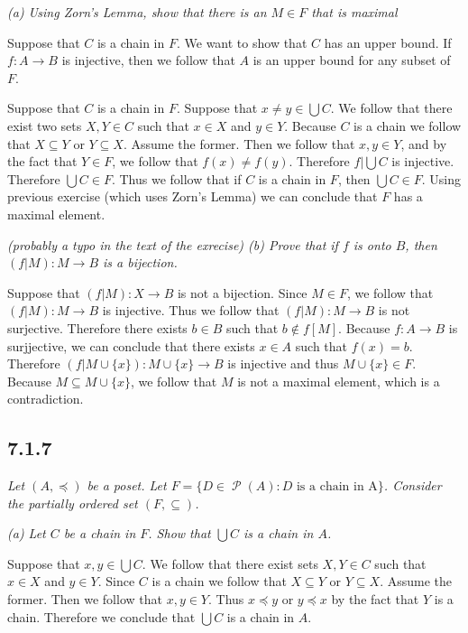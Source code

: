 \documentclass[11pt,oneside,titlepage]{book}
\DeclareMathOperator \pow {\mathcal {P}}
\newcommand{\set}[1]{\{ #1 \}}
\begin{document}
\textit{(a) Using Zorn's Lemma, show that there is an $M \in F$ that is maximal}

Suppose that $C$ is a chain in $F$. We want to show that $C$ has an upper bound.
If $f: A \to B$ is injective, then we follow that $A$ is an upper bound for any subset of $F$.

Suppose that $C$ is a chain in $F$. Suppose that $x \neq y \in \bigcup{C}$. We follow that
there exist two sets $X, Y \in C$ such that $x \in X$ and $y \in Y$. Because $C$ is a
chain we follow that $X \subseteq Y$ or $Y \subseteq X$. Assume the former. Then we follow that
$x, y \in Y$, and by the fact that $Y \in F$, we follow that $f(x) \neq f(y)$. Therefore
$f|\bigcup{C}$ is injective. Therefore $\bigcup{C} \in F$.
Thus we follow that if $C$ is a chain in $F$, then $\bigcup{C} \in F$. Using previous exercise
(which uses Zorn's Lemma) we can conclude that $F$ has a maximal element.

\textit{(probably a typo in the text of the exrecise)
  (b) Prove that if $f$ is onto $B$, then $(f|M): M \to B$ is a bijection.}

Suppose that $(f|M): X \to B$ is not a bijection. Since $M \in F$, we follow that
$(f|M): M \to B$ is injective. Thus we follow that $(f|M): M \to B$ is not surjective.
Therefore there exists $b \in B$ such that $b \notin f[M]$. Because $f: A \to B$ is
surjjective, we can conclude that there exists $x \in A$ such that $f(x) = b$. Therefore
$(f|M \cup \{x\}): M \cup \{x\} \to B$ is injective and thus $M \cup \{x\} \in F$.
Because $M \subseteq M \cup \{x\}$, we follow that $M$ is not a maximal element, which is
a contradiction.

\subsection*{7.1.7}

\textit{Let $(A, \preceq)$ be a poset. Let $F = \set{D \in \pow(A): D \text{ is a chain in A}}$.
  Consider the partially ordered set $(F, \subseteq)$.}

\textit{(a) Let $C$ be a chain in $F$. Show that $\bigcup{C}$ is a chain in $A$.}

Suppose that $x, y \in \bigcup{C}$. We follow that there exist sets $X, Y \in C$ such that
$x \in X$ and $y \in Y$. Since $C$ is a chain we follow that $X \subseteq Y$ or $Y \subseteq X$.
Assume the former. Then we follow that $x, y \in Y$. Thus $x \preceq y$ or $y \preceq x$
by the fact that $Y$ is a chain. Therefore we conclude that $\bigcup{C}$ is a chain in $A$.
\end{document}
